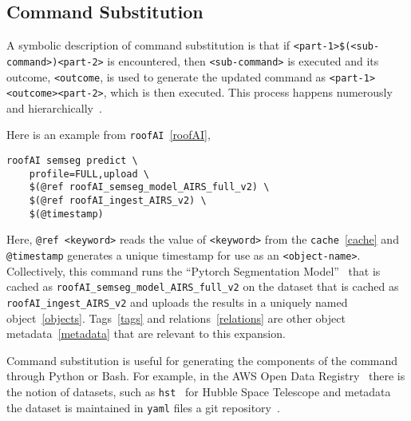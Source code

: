 \subsection{Command Substitution}
\label{command_substitution}

A symbolic description of command substitution is that if \texttt{<part-1>\$(<sub-command>)<part-2>} is encountered, then \texttt{<sub-command>} is executed and its outcome, \texttt{<outcome}, is used to generate the updated command as \texttt{<part-1><outcome><part-2>}, which is then executed. This process happens numerously and hierarchically~.

Here is an example from \texttt{roofAI}~\ref{roofAI},
%
\begin{verbatim}
roofAI semseg predict \
    profile=FULL,upload \
    $(@ref roofAI_semseg_model_AIRS_full_v2) \
    $(@ref roofAI_ingest_AIRS_v2) \
    $(@timestamp)
\end{verbatim}
%
Here, \texttt{@ref <keyword>} reads the value of \texttt{<keyword>} from the \texttt{cache}~\ref{cache} and \texttt{@timestamp} generates a unique timestamp for use as an \texttt{<object-name>}. Collectively, this command runs the \enquote{Pytorch Segmentation Model}~ that is cached as \texttt{roofAI_semseg_model_AIRS_full_v2} on the dataset that is cached as \texttt{roofAI_ingest_AIRS_v2} and uploads the results in a uniquely named object~\ref{objects}. Tags~\ref{tags} and relations~\ref{relations} are other object metadata~\ref{metadata} that are relevant to this expansion.

Command substitution is useful for generating the components of the command through Python or Bash. For example, in the AWS Open Data Registry~ there is the notion of datasets, such as \texttt{hst}~ for Hubble Space Telescope and metadata the dataset is maintained in \texttt{yaml} files a git repository~. 

